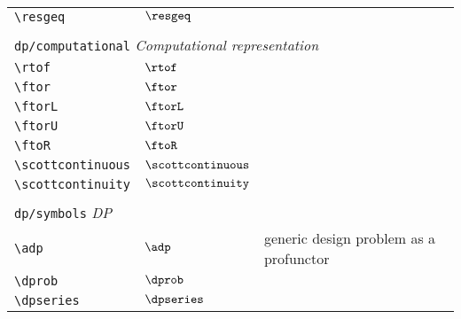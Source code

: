 \begin{longtable}{lll}
  {\color[rgb]{0.5,0.5,0.5}\texttt{\textbackslash resgeq}}                                                  & $\resgeq$                  &                                                         \\
  &                            &                                                         \\
  \multicolumn{3}{l}{{\color[rgb]{0.5,0.5,0.5}\texttt{dp/computational}} \emph{Computational representation}}
  \\
  \hline
  {\color[rgb]{0.5,0.5,0.5}\texttt{\textbackslash rtof}}                                                    & $\rtof$                    & \\
  {\color[rgb]{0.5,0.5,0.5}\texttt{\textbackslash ftor}}                                                    & $\ftor$                    & \\
  {\color[rgb]{0.5,0.5,0.5}\texttt{\textbackslash ftorL}}                                                   & $\ftorL$                   & \\
  {\color[rgb]{0.5,0.5,0.5}\texttt{\textbackslash ftorU}}                                                   & $\ftorU$                   & \\
  {\color[rgb]{0.5,0.5,0.5}\texttt{\textbackslash ftoR}}                                                    & $\ftoR$                    & \\
  {\color[rgb]{0.5,0.5,0.5}\texttt{\textbackslash scottcontinuous}}                                         & $\scottcontinuous$
  & \\
  {\color[rgb]{0.5,0.5,0.5}\texttt{\textbackslash scottcontinuity}}                                         & $\scottcontinuity$
  &
  \\
  &                            &                                                         \\
  \multicolumn{3}{l}{{\color[rgb]{0.5,0.5,0.5}\texttt{dp/symbols}} \emph{DP}} \\
  \hline
  {\color[rgb]{0.5,0.5,0.5}\texttt{\textbackslash adp}}                                                     & $\adp$                     & generic design problem as a profunctor\\
  {\color[rgb]{0.5,0.5,0.5}\texttt{\textbackslash dprob}}                                                   & $\dprob$                   & \\
  {\color[rgb]{0.5,0.5,0.5}\texttt{\textbackslash dpseries}}                                                & $\dpseries$                & \\

\end{longtable}
